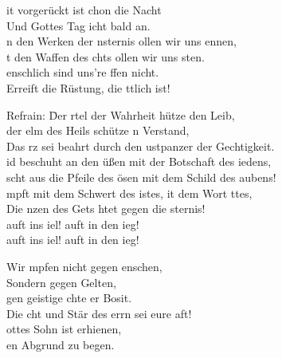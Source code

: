 
it vorgerückt ist chon die Nacht\\
Und Gottes Tag icht bald an.\\
n den Werken der nsternis ollen wir uns 
ennen,\\
t den Waffen des chts ollen wir uns sten.\\
enschlich sind uns're ffen nicht.\\
Erreift die Rüstung, die ttlich ist!

\begin{tabbing}
Refrain: \= 	Der rtel der Wahrheit hütze den Leib, \\
          \>      der elm des Heils schütze n Verstand,\\
	\>	Das rz sei beahrt durch den ustpanzer der Gechtigkeit.\\
   \>  id beschuht an den üßen mit der Botschaft des
     iedens,\\
     \> scht aus die Pfeile des ösen mit dem Schild des 
      aubens!\\
     \> mpft mit dem Schwert des istes, it dem Wort ttes,\\
      \>          Die nzen des Gets htet gegen die 
     sternis!\\
      \> auft ins  iel! auft in den ieg!\\ 
      \> auft ins  iel! auft in den ieg! 
\end{tabbing}

Wir mpfen nicht gegen enschen, \\
Sondern gegen Gelten,\\
gen geistige chte er Bosit.\\
Die cht und Stär des errn sei eure aft!\\
ottes Sohn ist erhienen, \\
en Abgrund zu begen.\\


